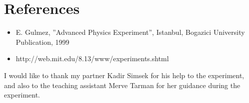 \documentclass[aps,twocolumn,secnumarabic,nobalancelastpage,amsmath,amssymb,
nofootinbib]{revtex4}
\begin{document}
\section{References}

\begin{itemize}
\item E. Gulmez, ”Advanced Physics Experiment”, Istanbul, Bogazici University Publication, 1999
\item http://web.mit.edu/8.13/www/experiments.shtml
\end{itemize}




\begin{acknowledgments} 

I would like to thank my partner Kadir Simsek for his help to the experiment, and also to the teaching assistant Merve Tarman for her guidance during the experiment.

\end{acknowledgments}

\end{document}
